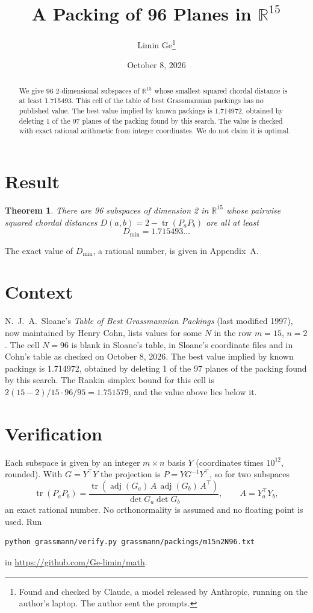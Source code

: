 \documentclass[11pt,a4paper]{article}
\title{A Packing of 96 Planes in $\mathbb{R}^{15}$}
\author{Limin Ge\thanks{Found and checked by Claude, a model released by Anthropic, running on the author's laptop. The author sent the prompts.}}
\date{October 8, 2026}
\newtheorem*{theorem}{Theorem}
\begin{document}
\maketitle
\begin{abstract}
We give 96 2-dimensional subspaces of $\mathbb{R}^{15}$ whose smallest squared chordal distance is at least 1.715493. This cell of the table of best Grassmannian packings has no published value. The best value implied by known packings is 1.714972, obtained by deleting 1 of the 97 planes of the packing found by this search. The value is checked with exact rational arithmetic from integer coordinates. We do not claim it is optimal.
\end{abstract}

\section{Result}
\begin{theorem}
There are 96 subspaces of dimension 2 in $\mathbb{R}^{15}$ whose pairwise squared chordal distances $D(a,b) = 2 - \operatorname{tr}(P_aP_b)$ are all at least
\[ D_{\min} = 1.715493\ldots \]
\end{theorem}
The exact value of $D_{\min}$, a rational number, is given in Appendix~A.


\section{Context}
N.~J.~A.~Sloane's \emph{Table of Best Grassmannian Packings} (last modified 1997), now maintained by Henry Cohn, lists values for some $N$ in the row $m=15$, $n=2$. The cell $N=96$ is blank in Sloane's table, in Sloane's coordinate files and in Cohn's table as checked on October 8, 2026. The best value implied by known packings is 1.714972, obtained by deleting 1 of the 97 planes of the packing found by this search. The Rankin simplex bound for this cell is $2(15-2)/15\cdot 96/95 = 1.751579$, and the value above lies below it.


\section{Verification}
Each subspace is given by an integer $m\times n$ basis $Y$ (coordinates times $10^{12}$, rounded). With $G=Y^\top Y$ the projection is $P=YG^{-1}Y^\top$, so for two subspaces
\[ \operatorname{tr}(P_aP_b)=\frac{\operatorname{tr}(\operatorname{adj}(G_a)\,A\,\operatorname{adj}(G_b)\,A^\top)}{\det G_a\det G_b},\qquad A=Y_a^\top Y_b, \]
an exact rational number. No orthonormality is assumed and no floating point is used. Run
\begin{verbatim}
python grassmann/verify.py grassmann/packings/m15n2N96.txt
\end{verbatim}
in \url{https://github.com/Ge-limin/math}.
\end{document}
